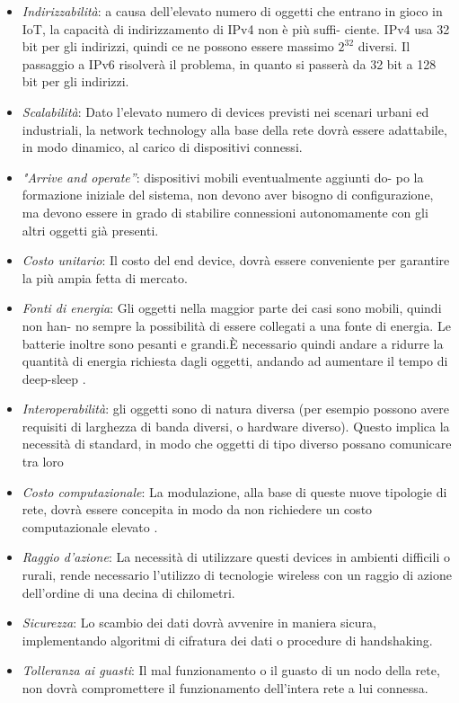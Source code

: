 \begin{itemize}
\item \textit{Indirizzabilità}: a causa dell’elevato numero di oggetti che entrano in
gioco in IoT, la capacità di indirizzamento di IPv4 non è più suffi-
ciente. IPv4 usa 32 bit per gli indirizzi, quindi ce ne possono essere
massimo $2^{32}$ diversi. Il passaggio a IPv6 risolverà il problema, in quanto si passerà da
32 bit a 128 bit per gli indirizzi. 
\item \textit{Scalabilità}: Dato l'elevato numero di devices previsti nei scenari
urbani ed industriali, la network technology alla base della rete dovrà essere 
adattabile, in modo dinamico, al carico di dispositivi connessi.
\item \textit{"Arrive and operate”}: dispositivi mobili eventualmente aggiunti do-
po la formazione iniziale del sistema, non devono aver bisogno di
configurazione, ma devono essere in grado di stabilire connessioni
autonomamente con gli altri oggetti già presenti.
\item \textit{Costo unitario}: Il costo del end device, dovrà essere conveniente
per garantire la più ampia fetta di mercato.
\item \textit{Fonti di energia}: 
Gli oggetti nella maggior parte dei casi sono mobili, quindi non han-
no sempre la possibilità di essere collegati a una fonte di energia. Le
batterie inoltre sono pesanti e grandi.È necessario quindi andare a ridurre la quantità 
di energia richiesta dagli oggetti, andando ad aumentare il tempo di deep-sleep
.
\item \textit{Interoperabilità}: gli oggetti sono di natura diversa (per esempio
possono avere requisiti di larghezza di banda diversi, o hardware diverso).
Questo implica la necessità di standard, in modo che oggetti di tipo
diverso possano comunicare tra loro
\item \textit{Costo computazionale}: La modulazione, alla base di queste nuove
tipologie di rete, dovrà essere concepita in modo da non richiedere un costo
computazionale elevato .
\item \textit{Raggio d'azione}: La necessità di utilizzare questi devices in ambienti
difficili o rurali, rende necessario l'utilizzo di tecnologie wireless con un
raggio di azione dell'ordine di una decina di chilometri.
\item \textit{Sicurezza}: Lo scambio dei dati dovrà avvenire in maniera sicura,
implementando algoritmi di cifratura dei dati o procedure di handshaking.
\item \textit{Tolleranza ai guasti}: Il mal funzionamento  o il guasto di un
nodo della rete,  non dovrà compromettere il funzionamento dell'intera rete a lui connessa. 
\end{itemize}

